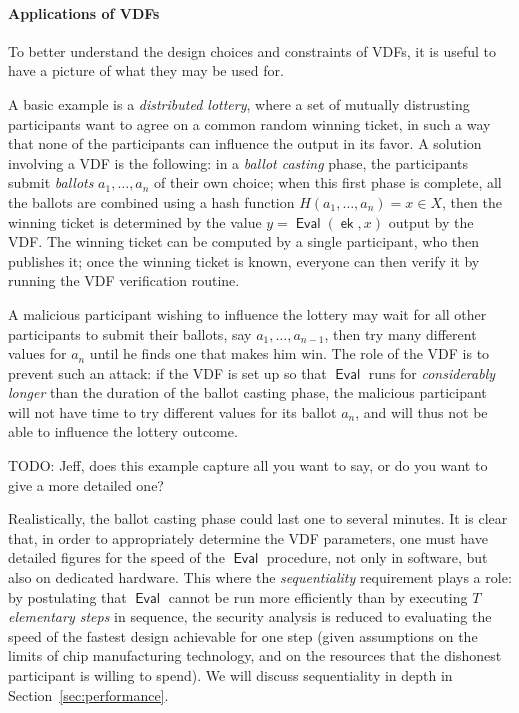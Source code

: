 \documentclass{article}
\DeclareMathOperator{\Eval}{\mathsf{Eval}}
\DeclareMathOperator{\ek}{\mathsf{ek}}
\begin{document}
\paragraph{Applications of VDFs}
To better understand the design choices and constraints of VDFs, it is
useful to have a picture of what they may be used for. %

A basic example is a \emph{distributed lottery}, where a set of
mutually distrusting participants want to agree on a common random
winning ticket, in such a way that none of the participants can
influence the output in its favor. %
A solution involving a VDF is the following: in a \emph{ballot
  casting} phase, the participants submit \emph{ballots}
$a_1,\ldots,a_n$ of their own choice; when this first phase is
complete, all the ballots are combined using a hash function
$H(a_1,\dots,a_n) = x\in X$, then the winning ticket is determined by
the value $y = \Eval(\ek,x)$ output by the VDF. %
The winning ticket can be computed by a single participant, who then
publishes it; once the winning ticket is known, everyone can then
verify it by running the VDF verification routine.

A malicious participant wishing to influence the lottery may wait for
all other participants to submit their ballots, say
$a_1,\dots,a_{n-1}$, then try many different values for $a_n$ until he
finds one that makes him win. %
The role of the VDF is to prevent such an attack: if the VDF is set up
so that $\Eval$ runs for \emph{considerably longer} than the duration
of the ballot casting phase, the malicious participant will not have
time to try different values for its ballot $a_n$, and will thus not
be able to influence the lottery outcome.

TODO: Jeff, does this example capture all you want to say, or do you
want to give a more detailed one?

Realistically, the ballot casting phase could last one to several
minutes. %
It is clear that, in order to appropriately determine the VDF
parameters, one must have detailed figures for the speed of the
$\Eval$ procedure, not only in software, but also on dedicated
hardware. %
This where the \emph{sequentiality} requirement plays a role: by
postulating that $\Eval$ cannot be run more efficiently than by
executing $T$ \emph{elementary steps} in sequence, the security
analysis is reduced to evaluating the speed of the fastest design
achievable for one step (given assumptions on the limits of chip
manufacturing technology, and on the resources that the dishonest
participant is willing to spend). %
We will discuss sequentiality in depth in
Section~\ref{sec:performance}.
\end{document}
